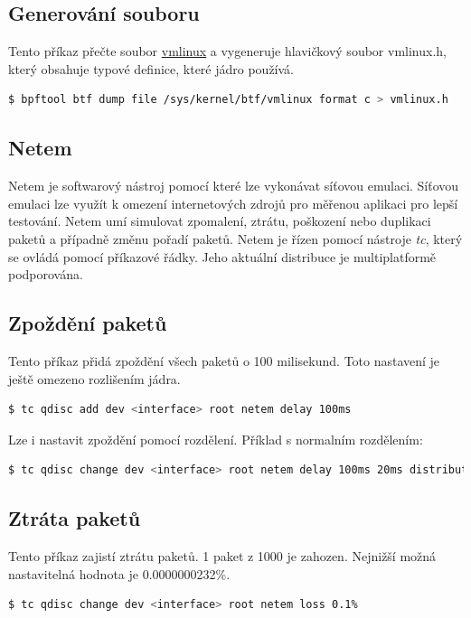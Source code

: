 \subsection*{Generování souboru}
Tento příkaz přečte soubor \hyperref[sec:vmlinux]{vmlinux} a vygeneruje hlavičkový soubor vmlinux.h, který obsahuje typové definice, které jádro používá.
\begin{lstlisting}[language=bash]
    $ bpftool btf dump file /sys/kernel/btf/vmlinux format c > vmlinux.h
\end{lstlisting}

\subsection{Netem}

Netem\cite{Netem} je softwarový nástroj pomocí které lze vykonávat síťovou emulaci. Síťovou emulaci lze využít k omezení internetových zdrojů
pro měřenou aplikaci pro lepší testování. Netem umí simulovat zpomalení, ztrátu, poškození nebo duplikaci paketů a případně změnu pořadí
paketů. Netem je řízen pomocí nástroje \emph{tc}, který se ovládá pomocí příkazové řádky. Jeho aktuální distribuce je multiplatformě podporována.

\subsection*{Zpoždění paketů}
Tento příkaz přidá zpoždění všech paketů o 100 milisekund. Toto nastavení je ještě omezeno rozlišením jádra.
\begin{lstlisting}[language=bash]
    $ tc qdisc add dev <interface> root netem delay 100ms
\end{lstlisting}

\noindent Lze i nastavit zpoždění pomocí rozdělení. Příklad s normalním rozdělením:
\begin{lstlisting}[language=bash]
    $ tc qdisc change dev <interface> root netem delay 100ms 20ms distribution normal
\end{lstlisting}

\subsection*{Ztráta paketů}
Tento příkaz zajistí ztrátu paketů. 1 paket z 1000 je zahozen. Nejnižší možná nastavitelná hodnota je 0.0000000232\%.
\begin{lstlisting}[language=bash]
    $ tc qdisc change dev <interface> root netem loss 0.1%
\end{lstlisting}

